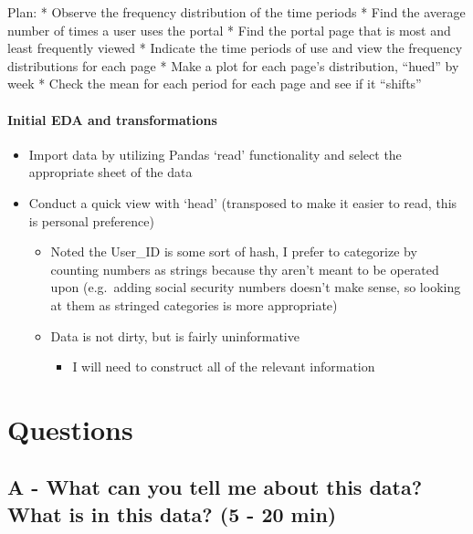 \documentclass[11pt]{article}
\providecommand{\tightlist}{%
      \setlength{\itemsep}{0pt}\setlength{\parskip}{0pt}}
\begin{document}
Plan: * Observe the frequency distribution of the time periods * Find
the average number of times a user uses the portal * Find the portal
page that is most and least frequently viewed * Indicate the time
periods of use and view the frequency distributions for each page * Make
a plot for each page's distribution, ``hued'' by week * Check the mean
for each period for each page and see if it ``shifts''

\hypertarget{initial-eda-and-transformations}{%
\paragraph{Initial EDA and
transformations}\label{initial-eda-and-transformations}}

\begin{itemize}
\tightlist
\item
  Import data by utilizing Pandas `read' functionality and select the
  appropriate sheet of the data
\item
  Conduct a quick view with `head' (transposed to make it easier to
  read, this is personal preference)

  \begin{itemize}
  \tightlist
  \item
    Noted the User\_ID is some sort of hash, I prefer to categorize by
    counting numbers as strings because thy aren't meant to be operated
    upon (e.g.~adding social security numbers doesn't make sense, so
    looking at them as stringed categories is more appropriate)
  \item
    Data is not dirty, but is fairly uninformative

    \begin{itemize}
    \tightlist
    \item
      I will need to construct all of the relevant information
    \end{itemize}
  \end{itemize}
\end{itemize}

    \hypertarget{questions}{%
\section{Questions}\label{questions}}

\hypertarget{a---what-can-you-tell-me-about-this-data-what-is-in-this-data-5---20-min}{%
\subsection{A - What can you tell me about this data? What is in this
data? (5 - 20
min)}\label{a---what-can-you-tell-me-about-this-data-what-is-in-this-data-5---20-min}}
\end{document}
